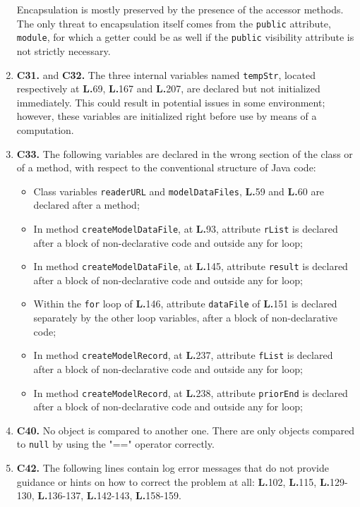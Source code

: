 \begin{enumerate}
Encapsulation is mostly preserved by the presence of the accessor methods. The only threat to encapsulation itself comes from the \texttt{public} attribute, \texttt{module}, for which a getter could be as well if the \texttt{public} visibility attribute is not strictly necessary.
\item \textbf{C31.} and \textbf{C32.} The three internal variables named \texttt{tempStr}, located respectively at \textbf{L.}69, \textbf{L.}167 and \textbf{L.}207, are declared but not initialized immediately. This could result in potential issues in some environment; however, these variables are initialized right before use by means of a computation.
\item \textbf{C33.} The following variables are declared in the wrong section of the class or of a method, with respect to the conventional structure of Java code:
	\begin{itemize}
	\item Class variables \texttt{readerURL} and \texttt{modelDataFiles}, \textbf{L.}59 and \textbf{L.}60 are declared after a method;
	\item In method \texttt{createModelDataFile}, at \textbf{L.}93, attribute \texttt{rList} is declared after a block of non-declarative code and outside any for loop;
	\item In method \texttt{createModelDataFile}, at \textbf{L.}145, attribute \texttt{result} is declared after a block of non-declarative code and outside any for loop;
	\item Within the \texttt{for} loop of \textbf{L.}146, attribute \texttt{dataFile} of \textbf{L.}151 is declared separately by the other loop variables, after a block of non-declarative code;
	\item In method \texttt{createModelRecord}, at \textbf{L.}237, attribute \texttt{fList} is declared after a block of non-declarative code and outside any for loop;
	\item In method \texttt{createModelRecord}, at \textbf{L.}238, attribute \texttt{priorEnd} is declared after a block of non-declarative code and outside any for loop;
	\end{itemize}
\item \textbf{C40.} No object is compared to another one. There are only objects compared to \texttt{null} by using the "==" operator correctly.
\item \textbf{C42.} The following lines contain log error messages that do not provide guidance or hints on how to correct the problem at all: \textbf{L.}102, \textbf{L.}115, \textbf{L.}129-130, \textbf{L.}136-137, \textbf{L.}142-143, \textbf{L.}158-159.
\end{enumerate}

